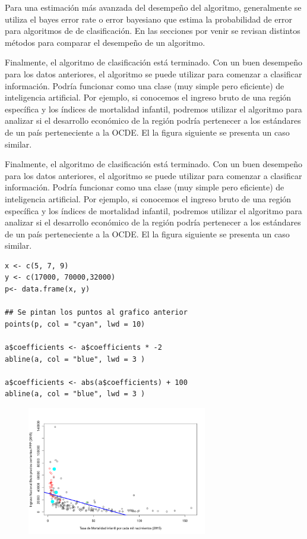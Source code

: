 \documentclass[letterpaper,12pt, spanish, oneside]{book} %
\begin{document}
Para una estimación más avanzada del desempeño del algoritmo,  generalmente se utiliza el bayes error rate o error bayesiano que estima la probabilidad de error para algoritmos de de clasificación. En las secciones por venir se revisan distintos métodos para comparar el desempeño de un algoritmo.

Finalmente, el algoritmo de clasificación está terminado. Con un buen desempeño para los datos anteriores, el algoritmo se puede utilizar para comenzar a clasificar información. Podría funcionar como una clase (muy simple pero eficiente) de inteligencia artificial. Por ejemplo, si conocemos el ingreso bruto de una región específica y los índices de mortalidad infantil, podremos utilizar el algoritmo para analizar si el desarrollo económico de la región podría pertenecer a los estándares de un país perteneciente a la OCDE. El la figura siguiente se presenta un caso similar. 

Finalmente, el algoritmo de clasificación está terminado. Con un buen desempeño para los datos anteriores, el algoritmo se puede utilizar para comenzar a clasificar información. Podría funcionar como una clase (muy simple pero eficiente) de inteligencia artificial. Por ejemplo, si conocemos el ingreso bruto de una región específica y los índices de mortalidad infantil, podremos utilizar el algoritmo para analizar si el desarrollo económico de la región podría pertenecer a los estándares de un país perteneciente a la OCDE. El la figura siguiente se presenta un caso similar. 

\begin{lstlisting}
x <- c(5, 7, 9)
y <- c(17000, 70000,32000)
p<- data.frame(x, y)

## Se pintan los puntos al grafico anterior
points(p, col = "cyan", lwd = 10)

a$coefficients <- a$coefficients * -2
abline(a, col = "blue", lwd = 3 )

a$coefficients <- abs(a$coefficients) + 100
abline(a, col = "blue", lwd = 3 )
\end{lstlisting}

\begin{figure}[H]
\centering
\includegraphics[width=0.7\textwidth]{clasificadorlinealnuevos.png}
\caption{\label{fig:frog2}\textit{}}
\end{figure}
\end{document}
